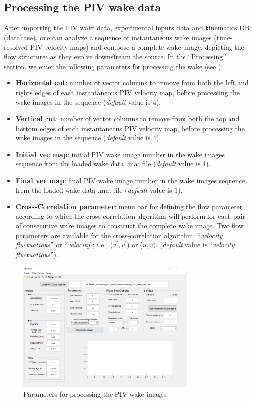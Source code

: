 \documentclass[12pt,a4paper]{article}
\begin{document}
\subsection{Processing the PIV wake data}
After importing the PIV wake data, experimental inputs data and kinematics DB (database), one can analyze a sequence of instantaneous wake images (time-resolved PIV velocity maps) and compose a complete wake image, depicting the flow structures as they evolve downstream the source.
In the ``Processing'' section, we enter the following parameters for processing the wake (see ):
\begin{itemize}
	\item \textbf{Horizontal cut}: number of vector columns to remove from both the left and rights edges of each instantaneous PIV velocity map, before processing the wake images in the sequence (\textit{default} value is 4).
	\item \textbf{Vertical cut}: number of vector columns to remove from both the top and bottom edges of each instantaneous PIV velocity map, before processing the wake images in the sequence (\textit{default} value is 4).
	\item \textbf{Initial vec map}: initial PIV wake image number in the wake images sequence from the loaded wake data .mat file (\textit{default} value is 1).
	\item \textbf{Final vec map}: final PIV wake image number in the wake images sequence from the loaded wake data .mat file (\textit{default} value is 1).
	\item \textbf{Cross-Correlation parameter}: menu bar for defining the flow parameter according to which the cross-correlation algorithm will perform for each pair of consecutive wake images to construct the complete wake image. Two flow parameters are available for the cross-correlation algorithm:  ``\textit{velocity fluctuations}'' or ``\textit{velocity}''; i.e., ($u^\prime, v^\prime$) or ($u,v$). (\textit{default} value is ``\textit{velocity fluctuations}'').
\end{itemize}
  
\begin{figure}[ht!]
 	\centering
 	\includegraphics[width=0.79\textwidth]{Wake-processing-parameters}
 	\caption{Parameters for processing the PIV wake images}
 	\label{fig:GUI-Wake-processing-parameters}
\end{figure}
\end{document}
